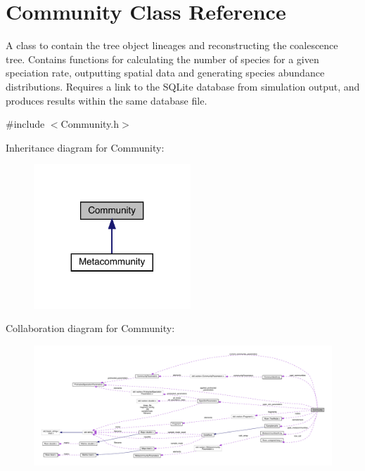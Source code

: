 \hypertarget{class_community}{}\section{Community Class Reference}
\label{class_community}


A class to contain the tree object lineages and reconstructing the coalescence tree. Contains functions for calculating the number of species for a given speciation rate, outputting spatial data and generating species abundance distributions. Requires a link to the S\+Q\+Lite database from simulation output, and produces results within the same database file.  




{\ttfamily \#include $<$Community.\+h$>$}



Inheritance diagram for Community\+:
\nopagebreak
\begin{figure}[H]
\begin{center}
\leavevmode
\includegraphics[width=167pt]{class_community__inherit__graph}
\end{center}
\end{figure}


Collaboration diagram for Community\+:
\nopagebreak
\begin{figure}[H]
\begin{center}
\leavevmode
\includegraphics[width=350pt]{class_community__coll__graph}
\end{center}
\end{figure}
